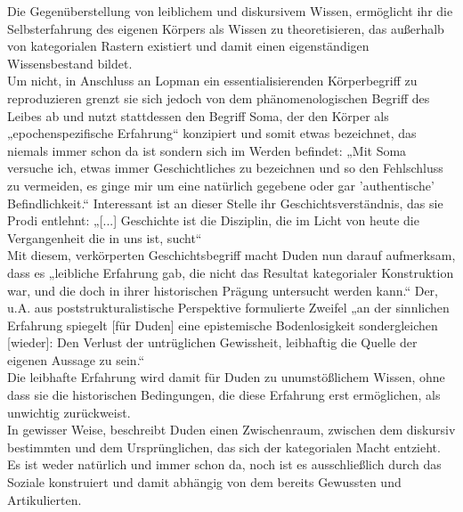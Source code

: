 \noindent Die Gegenüberstellung von leiblichem und diskursivem Wissen, ermöglicht ihr die
Selbsterfahrung des eigenen Körpers als Wissen zu theoretisieren, das außerhalb
von kategorialen Rastern existiert und damit einen eigenständigen
Wissensbestand bildet. \\
Um nicht, in Anschluss an Lopman ein essentialisierenden
Körperbegriff zu reproduzieren grenzt sie sich jedoch von dem
phänomenologischen Begriff des Leibes ab und nutzt stattdessen den Begriff
Soma, der den Körper als „epochenspezifische Erfahrung“\footnotemark
{} konzipiert und somit
etwas bezeichnet, das niemals immer schon da ist sondern sich im Werden
befindet: „Mit Soma versuche ich, etwas immer Geschichtliches zu bezeichnen und
so den Fehlschluss zu vermeiden, es ginge mir um eine natürlich gegebene oder
gar 'authentische' Befindlichkeit.“\footnotemark{} Interessant ist an dieser Stelle ihr
Geschichtsverständnis, das sie Prodi entlehnt: „[...] Geschichte ist die
Disziplin, die im Licht von heute die Vergangenheit die in uns ist, sucht“\footnotemark {}\\

\noindent Mit diesem, verkörperten Geschichtsbegriff macht Duden nun darauf aufmerksam,
dass es „leibliche Erfahrung gab, die nicht das Resultat kategorialer
Konstruktion war, und die doch in ihrer historischen Prägung untersucht werden
kann.“\footnotemark {} Der, u.A. aus poststrukturalistische Perspektive formulierte Zweifel
„an der sinnlichen Erfahrung spiegelt [für Duden] eine epistemische
Bodenlosigkeit sondergleichen [wieder]: Den Verlust der untrüglichen
Gewissheit, leibhaftig die Quelle der eigenen Aussage zu sein.“\footnotemark {}\\
Die leibhafte
Erfahrung wird damit für Duden zu unumstößlichem Wissen, ohne dass sie die
historischen Bedingungen, die diese Erfahrung erst ermöglichen, als unwichtig
zurückweist. \\
In gewisser Weise, beschreibt Duden einen Zwischenraum, zwischen
dem diskursiv bestimmten und dem Ursprünglichen, das sich der kategorialen
Macht entzieht. Es ist weder natürlich und immer schon da, noch ist es
ausschließlich durch das Soziale konstruiert und damit abhängig von dem bereits
Gewussten und Artikulierten. \\

